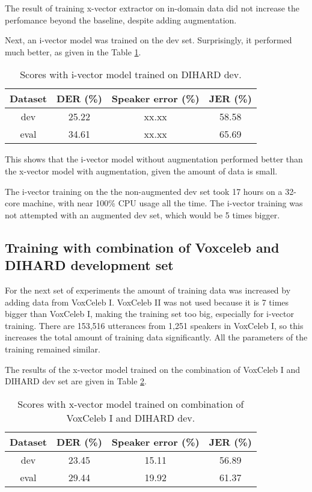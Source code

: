 		The result of training x-vector extractor on in-domain data did not increase the perfomance beyond the baseline, despite adding augmentation. 
		
		Next, an i-vector model was trained on the dev set. Surprisingly, it performed much better, as given in the Table \ref{table-dev-ivec}.
		
		\begin{table}[h]
			\centering
			\begin{tabular}{|c|c|c|c|}
				\hline
				Dataset & DER (\%) & Speaker error (\%) & JER (\%) \\
				\hline
				dev & 25.22 & xx.xx & 58.58 \\
				\hline
				eval & 34.61 & xx.xx & 65.69 \\
				\hline
			\end{tabular}
			\caption{Scores with i-vector model trained on DIHARD dev.}
			\label{table-dev-ivec}
		\end{table}
		
		This shows that the i-vector model without augmentation performed better than the x-vector model with augmentation, given the amount of data is small.
			
		The i-vector training on the the non-augmented dev set took 17 hours on a 32-core machine, with near 100\% CPU usage all the time. The i-vector training was not attempted with an augmented dev set, which would be 5 times bigger.
						
		\subsection{Training with combination of Voxceleb and DIHARD development set}
			For the next set of experiments the amount of training data was increased by adding data from VoxCeleb I. VoxCeleb II was not used because it is 7 times bigger than VoxCeleb I, making the training set too big, especially for i-vector training. There are 153,516 utterances from 1,251 speakers in VoxCeleb I, so this increases the total amount of training data significantly. All the parameters of the training remained similar.
			
			The results of the x-vector model trained on the combination of VoxCeleb I and DIHARD dev set are given in Table \ref{table-voxdev-xvec}.
			
			\begin{table}[h]
				\centering
				\begin{tabular}{|c|c|c|c|}
					\hline
					Dataset & DER (\%) & Speaker error (\%) & JER (\%) \\
					\hline
					dev & 23.45 & 15.11 & 56.89 \\
					\hline
					eval & 29.44 & 19.92 & 61.37 \\
					\hline
				\end{tabular}
				\caption{Scores with x-vector model trained on combination of VoxCeleb I and DIHARD dev.}
				\label{table-voxdev-xvec}
			\end{table}
		
